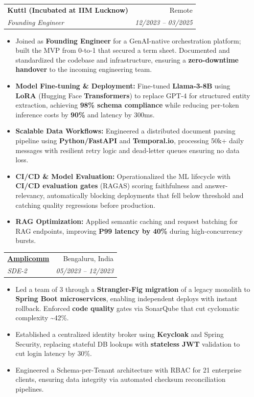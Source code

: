 \documentclass[11pt,a4paper]{article}
\makeatletter
\newcommand{\resumeItem}[1]{
  \item\small{
    {#1 \vspace{-2pt}}
  }
}
\newcommand{\resumeSubheading}[4]{
  \vspace{-1pt}\item
    \begin{tabular*}{0.97\textwidth}[t]{l@{\extracolsep{\fill}}r}
      \textbf{#1} & #2 \\
      \textit{\small#3} & \textit{\small #4} \\
    \end{tabular*}\vspace{-5pt}
}
\newcommand{\resumeItemListStart}{\begin{itemize}[itemsep=2pt, topsep=0pt, partopsep=0pt]}
\newcommand{\resumeItemListEnd}{\end{itemize}\vspace{-5pt}}
\makeatother
\begin{document}
    \resumeSubheading
      {Kuttl (Incubated at IIM Lucknow)}{Remote}
      {Founding Engineer}{12/2023 -- 03/2025}
      \resumeItemListStart
        \resumeItem{Joined as \textbf{Founding Engineer} for a GenAI-native orchestration platform; built the MVP from 0-to-1 that secured a term sheet. Documented and standardized the codebase and infrastructure, ensuring a \textbf{zero-downtime handover} to the incoming engineering team.}
        \resumeItem{\textbf{Model Fine-tuning \& Deployment:} Fine-tuned \textbf{Llama-3-8B} using \textbf{LoRA} (Hugging Face \textbf{Transformers}) to replace GPT-4 for structured entity extraction, achieving \textbf{98\% schema compliance} while reducing per-token inference costs by \textbf{90\%} and latency by 300ms.}
        \resumeItem{\textbf{Scalable Data Workflows:} Engineered a distributed document parsing pipeline using \textbf{Python/FastAPI} and \textbf{Temporal.io}, processing 50k+ daily messages with resilient retry logic and dead-letter queues ensuring no data loss.}
        \resumeItem{\textbf{CI/CD \& Model Evaluation:} Operationalized the ML lifecycle with \textbf{CI/CD evaluation gates} (RAGAS) scoring faithfulness and answer-relevancy, automatically blocking deployments that fell below threshold and catching quality regressions before production.}
        \resumeItem{\textbf{RAG Optimization:} Applied semantic caching and request batching for RAG endpoints, improving \textbf{P99 latency by 40\%} during high-concurrency bursts.}
      \resumeItemListEnd

    \resumeSubheading
      {\href{https://amplicomm.com/}{Amplicomm}}{Bengaluru, India}
      {SDE-2}{05/2023 -- 12/2023}
      \resumeItemListStart
        \resumeItem{Led a team of 3 through a \textbf{Strangler-Fig migration} of a legacy monolith to \textbf{Spring Boot microservices}, enabling independent deploys with instant rollback. Enforced \textbf{code quality} gates via SonarQube that cut cyclomatic complexity \textasciitilde{}42\%.}
        \resumeItem{Established a centralized identity broker using \textbf{Keycloak} and Spring Security, replacing stateful DB lookups with \textbf{stateless JWT} validation to cut login latency by 30\%.}
        \resumeItem{Engineered a Schema-per-Tenant architecture with RBAC for 21 enterprise clients, ensuring data integrity via automated checksum reconciliation pipelines.}
      \resumeItemListEnd
\end{document}
